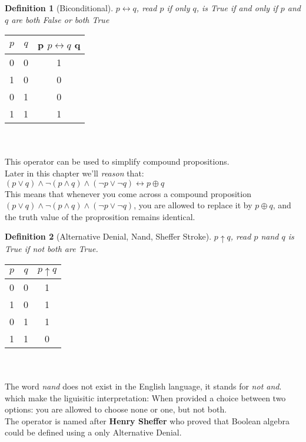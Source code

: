 \documentclass[10pt,a4paper,draft,titlepage,onecolumn]{book}
\newtheorem{definition}{Definition}[section]
\begin{document}
\begin{definition}[Biconditional] $p{\leftrightarrow}q$, read $p$ if only $q$, is True if and only if $p$ and $q$ are both False or both True
\end{definition}
\begin{tabular}{ |c|c|c| }
 \hline
 $p$ & $q$ &  p $p{\leftrightarrow}q$ q  \\
 \hline
 0 & 0 & 1 \\
 1 & 0 & 0\\
 0 & 1 & 0\\
 1 & 1 & 1\\
 \hline
\end{tabular}\\\\
This operator can be used to simplify compound propositions. \\
Later in this chapter we'll \textit{reason} that:
$(p{\vee}q)\wedge{\neg}(p{\wedge}q)\wedge({\neg}p{\vee}{\neg}q) \leftrightarrow p \oplus q$\\
This means that whenever you come across a compound proposition $(p{\vee}q)\wedge{\neg}(p{\wedge}q)\wedge({\neg}p{\vee}{\neg}q)$, you are allowed to replace it by $p \oplus q$, and the truth value of the proprosition remains identical.


\begin{definition}[Alternative Denial, Nand, Sheffer Stroke] $p \uparrow  q$, read $p$ \textit{nand} $q$  is True if not both are True.
\end{definition}

\begin{tabular}{ |c|c|c| }
 \hline
 $p$ & $q$ &  $p{\uparrow}q$  \\
 \hline
 0 & 0 & 1 \\
 1 & 0 & 1\\
 0 & 1 & 1\\
 1 & 1 & 0\\
 \hline
\end{tabular}  \\\\
The word \textit{nand} does not exist in the English language, it stands for \textit{not and}. which make the liguisitic interpretation: When provided a choice between two options: you are allowed to choose none or one, but not both.\\
The operator is named after \textbf{Henry Sheffer} who proved that Boolean algebra could be defined using a only Alternative Denial. \\
\end{document}
